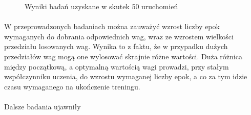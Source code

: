 \documentclass[../main.tex]{subfiles}
\begin{document}
    \begin{figure}[H]
    \centering
    \caption{Wyniki badań uzyskane w skutek 50 uruchomień}
    \end{figure}
    
    \paragraph{}
    W przeprowadzonych badaniach można zauważyć wzrost liczby epok wymaganych do dobrania odpowiednich wag, wraz ze wzrostem wielkości przedziału losowanych wag. Wynika to z faktu, że w przypadku dużych przedziałów wag mogą one wylosować skrajnie różne wartości. Duża różnica między początkową, a optymalną wartością wagi prowadzi, przy stałym współczynniku uczenia, do wzrostu wymaganej liczby epok, a co za tym idzie czasu wymaganego na ukończenie treningu.
    
    \paragraph{}
    Dalsze badania ujawniły 
    
    
\end{document}
